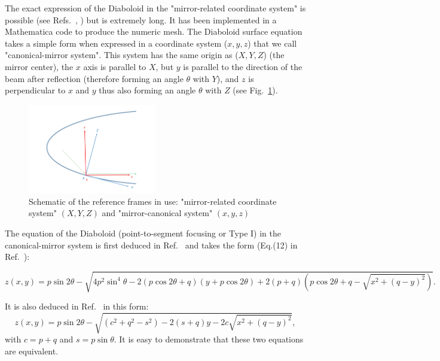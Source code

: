 \documentclass{iucr}              %
\begin{document}
The exact expression of the Diaboloid in the "mirror-related coordinate system" is possible (see  Refs.~\cite{Valeriy2020a}, \cite{Valeriy2020b}) but is extremely long. It has been implemented in a Mathematica code \cite{lacey} to produce the numeric mesh. The Diaboloid surface equation takes a simple form \cite{Valeriy2020a} when expressed in a coordinate system ($x,y,z$) that we call "canonical-mirror system". This system has the same origin as ($X,Y,Z$) (the mirror center), the $x$ axis is parallel to $X$, but $y$ is parallel to the direction of the beam after reflection (therefore forming an angle $\theta$ with $Y$), and $z$ is perpendicular to $x$ and $y$ thus also forming an angle $\theta$ with $Z$ (see Fig.~\ref{fig:frame}).

\begin{figure}[h]
\centering
\includegraphics[width=0.5\textwidth]{figures/diaboloid_frame.png}
\caption{\label{fig:frame}Schematic of the reference frames in use: "mirror-related coordinate system" $(X,Y,Z)$ and "mirror-canonical system" $(x,y,z)$}
\end{figure}

The equation of the Diaboloid (point-to-segment focusing or Type I) in the canonical-mirror system is first deduced in Ref.~\cite{Valeriy2020a} and takes the form (Eq.(12) in Ref.~\cite{Valeriy2020b}):

\begin{equation}
\label{eqn:diaboloidV}
z(x,y) = p \sin2\theta- \sqrt{ 4 p^2 \sin^4\theta - 2 (p \cos2\theta+q) (y + p  \cos2\theta) + 2 (p+q) (p \cos2\theta + q - \sqrt{x^2 + (q-y)^2}) }.
\end{equation}


It is also deduced in Ref.~\cite{Goldberg2020} in this form:
\begin{equation}
\label{eqn:diaboloidK}
z(x,y) = p \sin2\theta - \sqrt{(c^2 + q^2 - s^2) - 2 (s  + q) y - 2 c \sqrt{x^2 + (q-y)^2}},
\end{equation}
with $c=p+q$ and $s=p\sin\theta$. It is easy to demonstrate that these two equations are equivalent.
\end{document}
